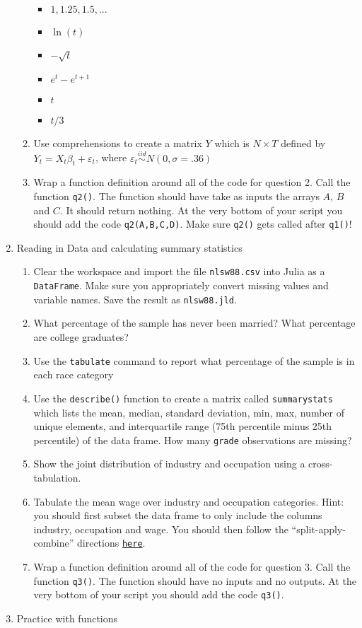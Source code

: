 \documentclass[12pt,english]{article}
\begin{document}
\begin{enumerate}
\begin{enumerate}
\begin{itemize}
\item $1,1.25,1.5,...$
\item $\ln\left(t\right)$
\item $-\sqrt{t}$
\item $e^{t}-e^{t+1}$
\item $t$
\item $t/3$
\end{itemize}
\item Use comprehensions to create a matrix $Y$ which is $N\times T$ defined by $Y_{t}=X_{t}\beta_{t}+\varepsilon_{t}$, where $\varepsilon_{t}\overset{iid}{\sim}N\left(0,\sigma=.36\right)$
\item Wrap a function definition around all of the code for question 2. Call the function \texttt{q2()}. The function should have take as inputs the arrays $A$, $B$ and $C$. It should return nothing. At the very bottom of your script you should add the code \texttt{q2(A,B,C,D)}. Make sure \texttt{q2()} gets called after \texttt{q1()}!
\end{enumerate}
\item Reading in Data and calculating summary statistics

\begin{enumerate}
\item Clear the workspace and import the file \texttt{nlsw88.csv} into Julia as a \texttt{DataFrame}. Make sure you appropriately convert missing values and variable names. Save the result as \texttt{nlsw88.jld}.
\item What percentage of the sample has never been married? What percentage are college graduates?
\item Use the \texttt{tabulate} command to report what percentage of the sample is in each race category
\item Use the \texttt{describe()} function to create a matrix called \texttt{summarystats} which lists the mean, median, standard deviation, min, max, number of unique elements, and interquartile range (75th percentile minus 25th percentile) of the data frame. How many \texttt{grade} observations are missing?
\item Show the joint distribution of industry and occupation using a cross-tabulation.
\item Tabulate the mean wage over industry and occupation categories. Hint: you should first subset the data frame to only include the columns industry, occupation and wage. You should then follow the ``split-apply-combine'' directions \href{https://juliadata.github.io/DataFrames.jl/stable/man/split_apply_combine/}{\texttt{here}}.
\item Wrap a function definition around all of the code for question 3. Call the function \texttt{q3()}. The function should have no inputs and no outputs. At the very bottom of your script you should add the code \texttt{q3()}.
\end{enumerate}
\item Practice with functions


\end{enumerate}
\end{document}

